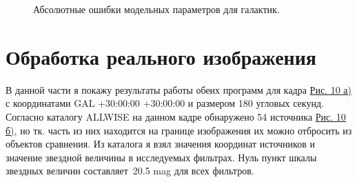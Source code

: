 \documentclass[12pt,a4paper]{article}
\begin{document}
\begin{figure}
    \caption{Абсолютные ошибки модельных параметров для галактик.} \label{pic9}
\end{figure}


\newpage      

\section{Обработка реального изображения}

В данной части я покажу результаты работы обеих программ для кадра \hyperref[pic10a]{Рис. 10 а)} с координатами GAL +30:00:00 +30:00:00 и размером 180 угловых секунд. Согласно каталогу ALLWISE на данном кадре обнаружено 54 источника \hyperref[pic10b]{Рис. 10 б)}, но тк. часть из них находится на границе изображения их можно отбросить из объектов сравнения. Из каталога я взял значения координат источников и значение звездной величины в исследуемых фильтрах. Нуль пункт шкалы звездных величин составляет~20.5 mag для всех фильтров.
\end{document}
